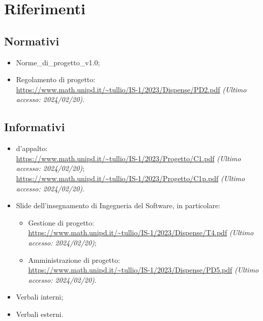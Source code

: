 \section{Riferimenti}
    \subsection{Normativi}
        \begin{itemize}
            \item Norme\_di\_progetto\_v1.0;
            \item Regolamento di progetto:\\
                \url{https://www.math.unipd.it/~tullio/IS-1/2023/Dispense/PD2.pdf} \textit{(Ultimo accesso: 2024/02/20)}.
    \end{itemize}
    \subsection{Informativi}
    \begin{itemize}
            \item {} d'appalto:\\
                    \url{https://www.math.unipd.it/~tullio/IS-1/2023/Progetto/C1.pdf} \textit{(Ultimo accesso: 2024/02/20)};\\
                    \url{https://www.math.unipd.it/~tullio/IS-1/2023/Progetto/C1p.pdf} \textit{(Ultimo accesso: 2024/02/20)}.
            \item Slide dell'insegnamento di Ingegneria del Software, in particolare:
            \begin{itemize}
                \item Gestione di progetto:\\
                \url{https://www.math.unipd.it/~tullio/IS-1/2023/Dispense/T4.pdf} \textit{(Ultimo accesso: 2024/02/20)};
                \item Amministrazione di progetto:\\
                \url{https://www.math.unipd.it/~tullio/IS-1/2023/Dispense/PD5.pdf} \textit{(Ultimo accesso: 2024/02/20)}.
            \end{itemize}
            \item Verbali interni;
            \item Verbali esterni.
    \end{itemize}

    \newpage